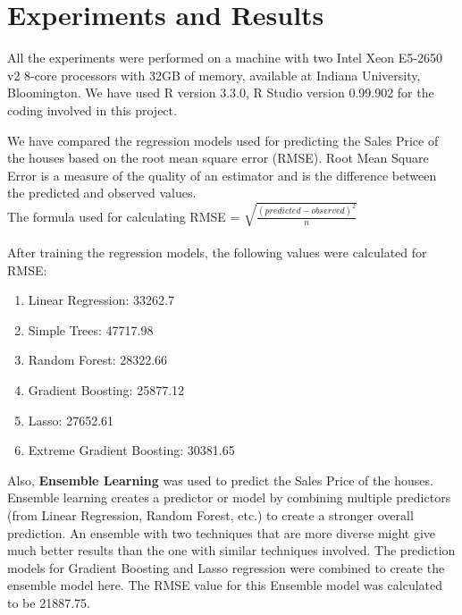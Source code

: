 \documentclass[fleqn,10pt]{SelfArx} %
\begin{document}

\section{Experiments and Results}
All the experiments were performed on a machine with two Intel Xeon E5-2650 v2 8-core processors with 32GB of memory, available at Indiana University, Bloomington. We have used R version 3.3.0, R Studio version 0.99.902 for the coding involved in this project.

We have compared the regression models used for predicting the Sales Price of the houses based on the root mean square error (RMSE). Root Mean Square Error is a measure of the quality of an estimator and is the difference between the predicted and observed values.
\\ The formula used for calculating RMSE = $\sqrt{\frac{(predicted-observed)^2}{n}}$
\\ \\After training the regression models, the following values were calculated for RMSE:
\begin{enumerate}[noitemsep] 
\item Linear Regression: 33262.7
\item Simple Trees: 47717.98
\item Random Forest: 28322.66
\item Gradient Boosting: 25877.12
\item Lasso: 27652.61
\item Extreme Gradient Boosting: 30381.65
\end{enumerate}
Also, \textbf{Ensemble Learning} was used to predict the Sales Price of the houses. Ensemble learning creates a predictor or model by combining multiple predictors (from Linear Regression, Random Forest, etc.) to create a stronger overall prediction. An ensemble with two techniques that are more diverse might give much better results than the one with similar techniques involved.
The prediction models for Gradient Boosting and Lasso regression were combined to create the ensemble model here.
The RMSE value for this Ensemble model was calculated to be 21887.75.
\end{document}
